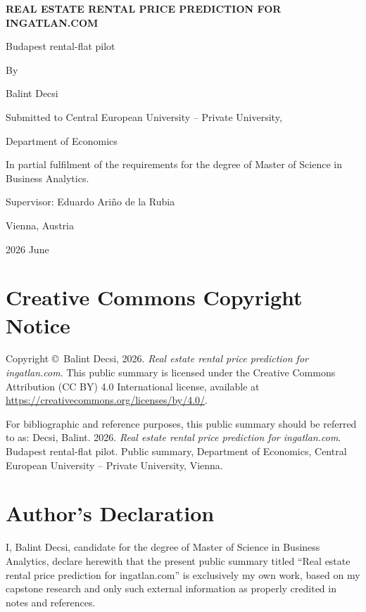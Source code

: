\documentclass[12pt,a4paper]{article}
\newcommand{\thesistitle}{Real estate rental price prediction for ingatlan.com}
\newcommand{\thesistitlecaps}{REAL ESTATE RENTAL PRICE PREDICTION FOR INGATLAN.COM}
\newcommand{\thesissubtitle}{Budapest rental-flat pilot}
\newcommand{\legalname}{Balint Decsi}
\newcommand{\departmentname}{Department of Economics}
\newcommand{\degreefullname}{Master of Science in Business Analytics}
\newcommand{\supervisorname}{Eduardo Ariño de la Rubia}
\newcommand{\submissionplace}{Vienna, Austria}
\newcommand{\submissionmonthyear}{2026 June}
\newcommand{\copyrightyear}{2026}
\newcommand{\cclink}{https://creativecommons.org/licenses/by/4.0/}
\begin{document}
\hypersetup{pageanchor=false}
\begin{titlepage}
\centering
\vspace*{1.5em}
{\Huge\bfseries \thesistitlecaps\par}
\vspace{1em}
{\Large \thesissubtitle\par}
\vspace{2em}
{\Large By\par}
\vspace{1em}
{\Large \legalname\par}
\vspace{3em}
{\large Submitted to Central European University -- Private University,\par}
{\large \departmentname\par}
\vspace{2em}
{\large In partial fulfilment of the requirements for the degree of \degreefullname.\par}
\vfill
{\large Supervisor: \supervisorname\par}
\vspace{2em}
{\large \submissionplace\par}
{\large \submissionmonthyear\par}
\end{titlepage}

\hypersetup{pageanchor=true}
\thispagestyle{plain}
\section*{Creative Commons Copyright Notice}

\noindent Copyright \copyright\ \legalname, \copyrightyear. \emph{\thesistitle}. This public summary is licensed under the Creative Commons Attribution (CC BY) 4.0 International license, available at \url{\cclink}.

\bigskip
\noindent For bibliographic and reference purposes, this public summary should be referred to as: Decsi, Balint. \copyrightyear. \emph{\thesistitle}. \thesissubtitle. Public summary, \departmentname, Central European University -- Private University, Vienna.

\clearpage
\thispagestyle{plain}
\section*{Author's Declaration}

\noindent I, \legalname, candidate for the degree of \degreefullname, declare herewith that the present public summary titled ``\thesistitle'' is exclusively my own work, based on my capstone research and only such external information as properly credited in notes and references.
\end{document}
